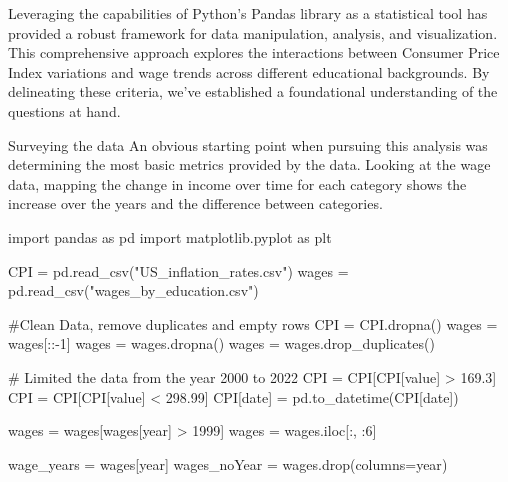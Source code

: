 \documentclass[
  letterpaper,
  DIV=11,
  numbers=noendperiod]{scrartcl}
\newenvironment{Shaded}{\begin{snugshade}}{\end{snugshade}}
\newcommand{\CommentTok}[1]{\textcolor[rgb]{0.37,0.37,0.37}{#1}}
\newcommand{\DecValTok}[1]{\textcolor[rgb]{0.68,0.00,0.00}{#1}}
\newcommand{\FloatTok}[1]{\textcolor[rgb]{0.68,0.00,0.00}{#1}}
\newcommand{\ImportTok}[1]{\textcolor[rgb]{0.00,0.46,0.62}{#1}}
\newcommand{\NormalTok}[1]{\textcolor[rgb]{0.00,0.23,0.31}{#1}}
\newcommand{\OperatorTok}[1]{\textcolor[rgb]{0.37,0.37,0.37}{#1}}
\newcommand{\StringTok}[1]{\textcolor[rgb]{0.13,0.47,0.30}{#1}}
\begin{document}
Leveraging the capabilities of Python's Pandas library as a statistical
tool has provided a robust framework for data manipulation, analysis,
and visualization. This comprehensive approach explores the interactions
between Consumer Price Index variations and wage trends across different
educational backgrounds. By delineating these criteria, we've
established a foundational understanding of the questions at hand.

Surveying the data An obvious starting point when pursuing this analysis
was determining the most basic metrics provided by the data. Looking at
the wage data, mapping the change in income over time for each category
shows the increase over the years and the difference between categories.

\begin{Shaded}
\begin{Highlighting}[]
\ImportTok{import}\NormalTok{ pandas }\ImportTok{as}\NormalTok{ pd}
\ImportTok{import}\NormalTok{ matplotlib.pyplot }\ImportTok{as}\NormalTok{ plt}


\NormalTok{CPI }\OperatorTok{=}\NormalTok{ pd.read\_csv(}\StringTok{"US\_inflation\_rates.csv"}\NormalTok{)}
\NormalTok{wages }\OperatorTok{=}\NormalTok{ pd.read\_csv(}\StringTok{"wages\_by\_education.csv"}\NormalTok{)}

\CommentTok{\#Clean Data, remove duplicates and empty rows}
\NormalTok{CPI }\OperatorTok{=}\NormalTok{ CPI.dropna()}
\NormalTok{wages }\OperatorTok{=}\NormalTok{ wages[::}\OperatorTok{{-}}\DecValTok{1}\NormalTok{]}
\NormalTok{wages }\OperatorTok{=}\NormalTok{ wages.dropna()}
\NormalTok{wages }\OperatorTok{=}\NormalTok{ wages.drop\_duplicates()}

\CommentTok{\# Limited the data from the year 2000 to 2022}
\NormalTok{CPI }\OperatorTok{=}\NormalTok{ CPI[CPI[}\StringTok{\textquotesingle{}value\textquotesingle{}}\NormalTok{] }\OperatorTok{\textgreater{}} \FloatTok{169.3}\NormalTok{]}
\NormalTok{CPI }\OperatorTok{=}\NormalTok{ CPI[CPI[}\StringTok{\textquotesingle{}value\textquotesingle{}}\NormalTok{] }\OperatorTok{\textless{}} \FloatTok{298.99}\NormalTok{]}
\NormalTok{CPI[}\StringTok{\textquotesingle{}date\textquotesingle{}}\NormalTok{] }\OperatorTok{=}\NormalTok{ pd.to\_datetime(CPI[}\StringTok{\textquotesingle{}date\textquotesingle{}}\NormalTok{])}

\NormalTok{wages }\OperatorTok{=}\NormalTok{ wages[wages[}\StringTok{\textquotesingle{}year\textquotesingle{}}\NormalTok{] }\OperatorTok{\textgreater{}} \DecValTok{1999}\NormalTok{]}
\NormalTok{wages }\OperatorTok{=}\NormalTok{ wages.iloc[:, :}\DecValTok{6}\NormalTok{]}


\NormalTok{wage\_years }\OperatorTok{=}\NormalTok{ wages[}\StringTok{\textquotesingle{}year\textquotesingle{}}\NormalTok{]}
\NormalTok{wages\_noYear }\OperatorTok{=}\NormalTok{ wages.drop(columns}\OperatorTok{=}\StringTok{\textquotesingle{}year\textquotesingle{}}\NormalTok{) }
\end{Highlighting}
\end{Shaded}
\end{document}

